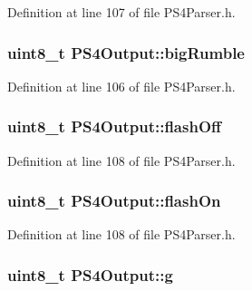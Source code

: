 \-Definition at line 107 of file \-P\-S4\-Parser.\-h.

\hypertarget{struct_p_s4_output_ac9e9e57cfce3e7b9588abb273bd908ec}{
\subsubsection[{big\-Rumble}]{\setlength{\rightskip}{0pt plus 5cm}uint8\-\_\-t {\bf \-P\-S4\-Output\-::big\-Rumble}}}\label{struct_p_s4_output_ac9e9e57cfce3e7b9588abb273bd908ec}


\-Definition at line 106 of file \-P\-S4\-Parser.\-h.

\hypertarget{struct_p_s4_output_a3f4dcb81acca1475402b93ac851b7be8}{
\subsubsection[{flash\-Off}]{\setlength{\rightskip}{0pt plus 5cm}uint8\-\_\-t {\bf \-P\-S4\-Output\-::flash\-Off}}}\label{struct_p_s4_output_a3f4dcb81acca1475402b93ac851b7be8}


\-Definition at line 108 of file \-P\-S4\-Parser.\-h.

\hypertarget{struct_p_s4_output_a4abdb9a24e512f7f2bad16df28b2fcab}{
\subsubsection[{flash\-On}]{\setlength{\rightskip}{0pt plus 5cm}uint8\-\_\-t {\bf \-P\-S4\-Output\-::flash\-On}}}\label{struct_p_s4_output_a4abdb9a24e512f7f2bad16df28b2fcab}


\-Definition at line 108 of file \-P\-S4\-Parser.\-h.

\hypertarget{struct_p_s4_output_afc78d4e2c0aafbf4b0a27db3746ad93c}{
\subsubsection[{g}]{\setlength{\rightskip}{0pt plus 5cm}uint8\-\_\-t {\bf \-P\-S4\-Output\-::g}}}\label{struct_p_s4_output_afc78d4e2c0aafbf4b0a27db3746ad93c}


